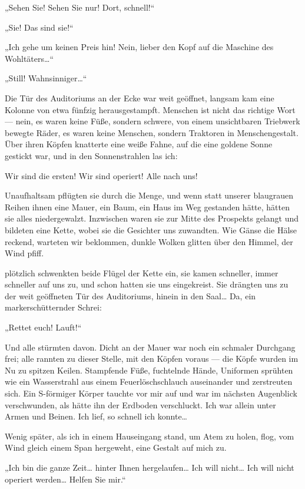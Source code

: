 „Sehen Sie! Sehen Sie nur! Dort, schnell!“

„Sie! Das sind sie!“

„Ich gehe um keinen Preis hin! Nein, lieber den Kopf auf die
Maschine des Wohltäters\ldots{}“

„Still! Wahnsinniger\ldots{}“

Die Tür des Auditoriums an der Ecke war weit geöffnet, langsam kam
eine Kolonne von etwa fünfzig  herausgestampft. Menschen
ist nicht das richtige Wort — nein, es waren keine Füße, sondern
schwere, von einem unsichtbaren Triebwerk bewegte Räder, es waren
keine Menschen, sondern Traktoren in Menschengestalt. Über ihren
Köpfen knatterte eine weiße Fahne, auf die eine goldene Sonne
gestickt war, und in den Sonnenstrahlen las ich:

\begin{meldung}
Wir sind die ersten! Wir sind operiert! Alle nach uns!
\end{meldung}

Unaufhaltsam
pflügten sie durch die Menge, und wenn statt unserer blaugrauen
Reihen ihnen eine Mauer, ein Baum, ein Haus im Weg gestanden hätte,
hätten sie alles niedergewalzt. Inzwischen waren sie zur Mitte des
Prospekts gelangt und bildeten eine Kette, wobei sie die Gesichter
uns zuwandten. Wie Gänse die Hälse reckend, warteten wir beklommen,
dunkle Wolken glitten über den Himmel, der Wind pfiff.

plötzlich schwenkten beide Flügel der Kette ein, sie kamen
schneller, immer schneller auf uns zu, und schon hatten sie uns
eingekreist. Sie drängten uns zu der weit geöffneten Tür des
Auditoriums, hinein in den Saal\ldots{} Da, ein markerschütternder
Schrei: 

„Rettet euch! Lauft!“

Und alle stürmten davon. Dicht an der Mauer war noch ein schmaler
Durchgang frei; alle rannten zu dieser Stelle, mit den Köpfen
voraus — die Köpfe wurden im Nu zu spitzen Keilen. Stampfende Füße,
fuchtelnde Hände, Uniformen sprühten wie ein Wasserstrahl aus einem
Feuerlöschschlauch auseinander und zerstreuten sich. Ein S-förmiger
Körper tauchte vor mir auf und war im nächsten Augenblick
verschwunden, als hätte ihn der Erdboden verschluckt. Ich war
allein unter Armen und Beinen. Ich lief, so schnell ich konnte\ldots{}

Wenig später, als ich in einem Hauseingang stand, um Atem zu holen,
flog, vom Wind gleich einem Span hergeweht, eine Gestalt auf mich
zu.

„Ich bin die ganze Zeit\ldots{} hinter Ihnen hergelaufen\ldots{} Ich will
nicht\ldots{} Ich will nicht operiert werden\ldots{} Helfen Sie mir.“

